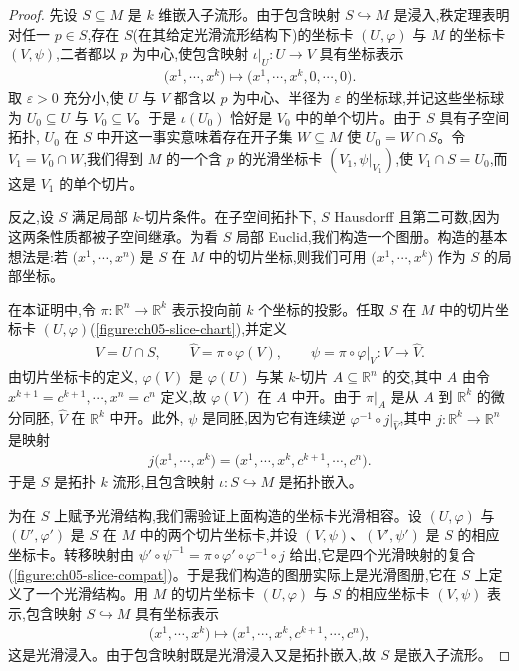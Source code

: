 \documentclass[../../main.tex]{subfiles}
\begin{document}
\begin{proof}
先设 $S\subseteq M$ 是 $k$ 维嵌入子流形。由于包含映射 $S\hookrightarrow M$ 是浸入,秩定理表明对任一 $p\in S$,存在 $S$(在其给定光滑流形结构下)的坐标卡 $(U,\varphi)$ 与 $M$ 的坐标卡 $(V,\psi)$,二者都以 $p$ 为中心,使包含映射 $\iota|_U:U\to V$ 具有坐标表示
\begin{align*}
\bigl(x^1,\cdots ,x^k\bigr)\mapsto\bigl(x^1,\cdots ,x^k,0,\cdots ,0\bigr).
\end{align*}
取 $\varepsilon>0$ 充分小,使 $U$ 与 $V$ 都含以 $p$ 为中心、半径为 $\varepsilon$ 的坐标球,并记这些坐标球为 $U_0\subseteq U$ 与 $V_0\subseteq V$。于是 $\iota(U_0)$ 恰好是 $V_0$ 中的单个切片。由于 $S$ 具有子空间拓扑, $U_0$ 在 $S$ 中开这一事实意味着存在开子集 $W\subseteq M$ 使 $U_0=W\cap S$。令 $V_1=V_0\cap W$,我们得到 $M$ 的一个含 $p$ 的光滑坐标卡 $(V_1,\psi|_{V_1})$,使 $V_1\cap S=U_0$,而这是 $V_1$ 的单个切片。

反之,设 $S$ 满足局部 $k$-切片条件。在子空间拓扑下, $S$ Hausdorff 且第二可数,因为这两条性质都被子空间继承。为看 $S$ 局部 Euclid,我们构造一个图册。构造的基本想法是:若 $\bigl(x^1,\cdots ,x^n\bigr)$ 是 $S$ 在 $M$ 中的切片坐标,则我们可用 $\bigl(x^1,\cdots ,x^k\bigr)$ 作为 $S$ 的局部坐标。

在本证明中,令 $\pi:\mathbb{R}^n\to\mathbb{R}^k$ 表示投向前 $k$ 个坐标的投影。任取 $S$ 在 $M$ 中的切片坐标卡 $(U,\varphi)$(\cref{figure:ch05-slice-chart}),并定义
\begin{align*}
V=U\cap S,\qquad \widehat{V}=\pi\circ\varphi(V),\qquad \psi=\pi\circ\varphi|_V:V\to\widehat{V}.
\end{align*}
由切片坐标卡的定义, $\varphi(V)$ 是 $\varphi(U)$ 与某 $k$-切片 $A\subseteq\mathbb{R}^n$ 的交,其中 $A$ 由令 $x^{k+1}=c^{k+1},\cdots ,x^n=c^n$ 定义,故 $\varphi(V)$ 在 $A$ 中开。由于 $\pi|_A$ 是从 $A$ 到 $\mathbb{R}^k$ 的微分同胚, $\widehat{V}$ 在 $\mathbb{R}^k$ 中开。此外, $\psi$ 是同胚,因为它有连续逆 $\varphi^{-1}\circ j|_{\widehat{V}}$,其中 $j:\mathbb{R}^k\to\mathbb{R}^n$ 是映射
\begin{align*}
j\bigl(x^1,\cdots ,x^k\bigr)=\bigl(x^1,\cdots ,x^k,c^{k+1},\cdots ,c^n\bigr).
\end{align*}
于是 $S$ 是拓扑 $k$ 流形,且包含映射 $\iota:S\hookrightarrow M$ 是拓扑嵌入。

为在 $S$ 上赋予光滑结构,我们需验证上面构造的坐标卡光滑相容。设 $(U,\varphi)$ 与 $(U',\varphi')$ 是 $S$ 在 $M$ 中的两个切片坐标卡,并设 $(V,\psi)$、$(V',\psi')$ 是 $S$ 的相应坐标卡。转移映射由 $\psi'\circ\psi^{-1}=\pi\circ\varphi'\circ\varphi^{-1}\circ j$ 给出,它是四个光滑映射的复合(\cref{figure:ch05-slice-compat})。于是我们构造的图册实际上是光滑图册,它在 $S$ 上定义了一个光滑结构。用 $M$ 的切片坐标卡 $(U,\varphi)$ 与 $S$ 的相应坐标卡 $(V,\psi)$ 表示,包含映射 $S\hookrightarrow M$ 具有坐标表示
\begin{align*}
\bigl(x^1,\cdots ,x^k\bigr)\mapsto\bigl(x^1,\cdots ,x^k,c^{k+1},\cdots ,c^n\bigr),
\end{align*}
这是光滑浸入。由于包含映射既是光滑浸入又是拓扑嵌入,故 $S$ 是嵌入子流形。
\end{proof}
\end{document}
